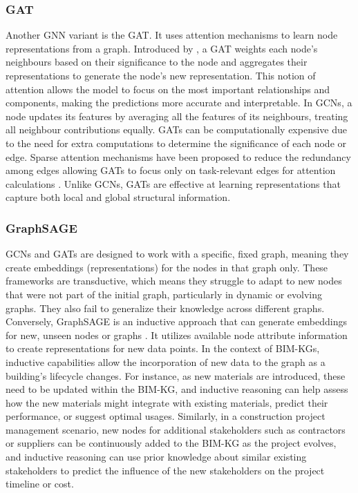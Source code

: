 \subsubsection{\ac{GAT}} 
Another \ac{GNN} variant is the \ac{GAT}. It uses attention mechanisms to learn node representations from a graph. Introduced by \cite{Velickovic2017GraphNetworks}, a \ac{GAT} weights each node's neighbours based on their significance to the node and aggregates their representations to generate the node's new representation. This notion of attention allows the model to focus on the most important relationships and components, making the predictions more accurate and interpretable. In \acp{GCN}, a node updates its features by averaging all the features of its neighbours, treating all neighbour contributions equally. \acp{GAT} can be computationally expensive due to the need for extra computations to determine the significance of each node or edge. Sparse attention mechanisms have been proposed to reduce the redundancy among edges allowing \acp{GAT} to focus only on task-relevant edges for attention calculations \citep{Ye2019SparseNetworks}. Unlike \acp{GCN}, \acp{GAT} are effective at learning representations that capture both local and global structural information.

\subsubsection{\ac{GraphSAGE}} 
\acp{GCN} and \acp{GAT} are designed to work with a specific, fixed graph, meaning they create embeddings (representations) for the nodes in that graph only. These frameworks are transductive, which means they struggle to adapt to new nodes that were not part of the initial graph, particularly in dynamic or evolving graphs. They also fail to generalize their knowledge across different graphs. Conversely, \ac{GraphSAGE} is an inductive approach that can generate embeddings for new, unseen nodes or graphs \cite{Hamilton2017InductiveGraphs}. It utilizes available node attribute information to create representations for new data points. In the context of \acp{BIM-KG}, inductive capabilities allow the incorporation of new data to the graph as a building's lifecycle changes. For instance, as new materials are introduced, these need to be updated within the \ac{BIM-KG}, and inductive reasoning can help assess how the new materials might integrate with existing materials, predict their performance, or suggest optimal usages. Similarly, in a construction project management scenario, new nodes for additional stakeholders such as contractors or suppliers can be continuously added to the \ac{BIM-KG} as the project evolves, and inductive reasoning can use prior knowledge about similar existing stakeholders to predict the influence of the new stakeholders on the project timeline or cost.

